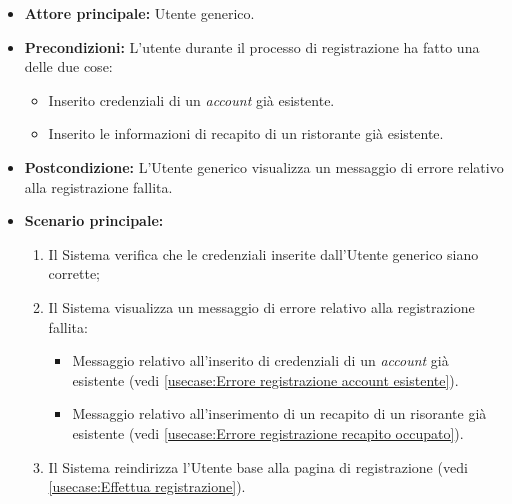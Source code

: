 \label{usecase:Registrazione fallita}

\begin{itemize}
	\item \textbf{Attore principale:} Utente generico.
	\item \textbf{Precondizioni:}
    L'utente durante il processo di registrazione ha fatto una delle due cose:
    \begin{itemize}
        \item Inserito credenziali di un \textit{account} già esistente.
        \item Inserito le informazioni di recapito di un ristorante già esistente.
    \end{itemize}
	\item \textbf{Postcondizione:} L'Utente generico visualizza un messaggio di errore relativo alla registrazione fallita.

	\item \textbf{Scenario principale:}
	\begin{enumerate}
        \item Il Sistema verifica che le credenziali inserite dall'Utente generico siano corrette;
        \item Il Sistema visualizza un messaggio di errore relativo alla registrazione fallita:
            \begin{itemize}
                \item Messaggio relativo all'inserito di credenziali di un \textit{account} già esistente (vedi \autoref{usecase:Errore registrazione account esistente}).
                \item Messaggio relativo all'inserimento di un recapito di un risorante già esistente (vedi \autoref{usecase:Errore registrazione recapito occupato}).
            \end{itemize}
        \item Il Sistema reindirizza l'Utente base alla pagina di registrazione (vedi \autoref{usecase:Effettua registrazione}).
    \end{enumerate}
	
\end{itemize}


